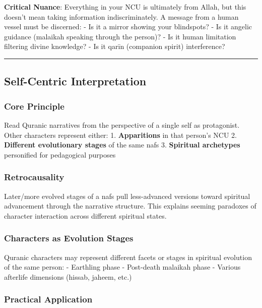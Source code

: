 \documentclass[12pt,a4paper]{article}
\begin{document}
\textbf{Critical Nuance}: Everything in your NCU is ultimately from
Allah, but this doesn't mean taking information indiscriminately. A
message from a human vessel must be discerned: - Is it a mirror showing
your blindspots? - Is it angelic guidance (malaikah speaking through the
person)? - Is it human limitation filtering divine knowledge? - Is it
qarīn (companion spirit) interference?

\begin{center}\rule{0.5\linewidth}{0.5pt}\end{center}

\subsection{Self-Centric
Interpretation}\label{self-centric-interpretation}

\subsubsection{Core Principle}\label{core-principle-1}

Read Quranic narratives from the perspective of a single self as
protagonist. Other characters represent either: 1. \textbf{Apparitions}
in that person's NCU 2. \textbf{Different evolutionary stages} of the
same nafs 3. \textbf{Spiritual archetypes} personified for pedagogical
purposes

\subsubsection{Retrocausality}\label{retrocausality}

Later/more evolved stages of a nafs pull less-advanced versions toward
spiritual advancement through the narrative structure. This explains
seeming paradoxes of character interaction across different spiritual
states.

\subsubsection{Characters as Evolution
Stages}\label{characters-as-evolution-stages}

Quranic characters may represent different facets or stages in spiritual
evolution of the same person: - Earthling phase - Post-death malaikah
phase - Various afterlife dimensions (hissab, jaheem, etc.)

\subsubsection{Practical Application}\label{practical-application}
\end{document}
